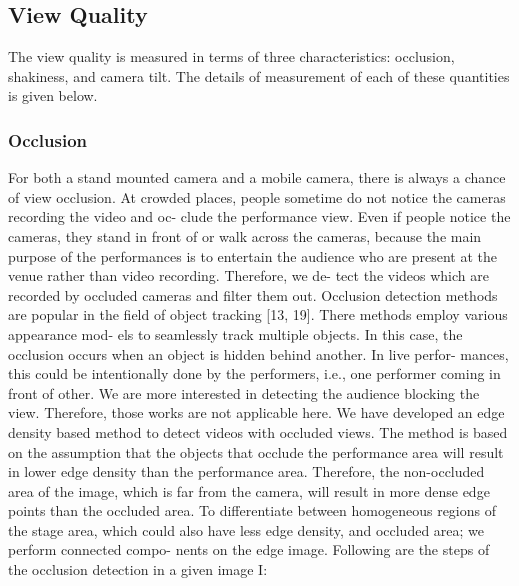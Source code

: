 \documentclass{sig-alternate}
\begin{document}
\subsection{View Quality}
\par The view quality is measured in terms of three characteristics:
occlusion, shakiness, and camera tilt. The details of measurement
of each of these quantities is given below.
\subsubsection{Occlusion}
For both a stand mounted camera and a mobile camera, there
is always a chance of view occlusion. At crowded places, people
sometime do not notice the cameras recording the video and oc-
clude the performance view. Even if people notice the cameras,
they stand in front of or walk across the cameras, because the main
purpose of the performances is to entertain the audience who are
present at the venue rather than video recording. Therefore, we de-
tect the videos which are recorded by occluded cameras and filter
them out.
Occlusion detection methods are popular in the field of object
tracking [13, 19]. There methods employ various appearance mod-
els to seamlessly track multiple objects. In this case, the occlusion
occurs when an object is hidden behind another. In live perfor-
mances, this could be intentionally done by the performers, i.e.,
one performer coming in front of other. We are more interested in
detecting the audience blocking the view. Therefore, those works
are not applicable here.
We have developed an edge density based method to detect videos
with occluded views. The method is based on the assumption that
the objects that occlude the performance area will result in lower
edge density than the performance area. Therefore, the non-occluded
area of the image, which is far from the camera, will result in more
dense edge points than the occluded area. To differentiate between
homogeneous regions of the stage area, which could also have less edge density, and occluded area; we perform connected compo-
nents on the edge image. Following are the steps of the occlusion
detection in a given image I:
\end{document}

